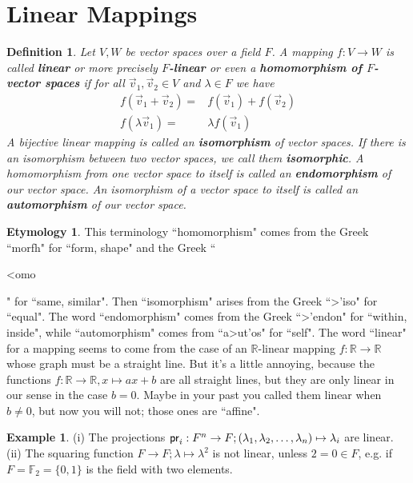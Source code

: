 \documentclass[11pt]{amsbook}
\newtheorem{definition}[theorem]{Definition}
\theoremstyle{definition}
\newtheorem{ex}[theorem]{Example}
\newtheorem*{etym}{Etymology}
\begin{document}
\section{Linear Mappings}

\begin{definition} \label{deflinmap} Let $V,W$ be vector spaces over a field $F$. A mapping $f: V\to W$ is called {\bf linear} or more precisely {\bf $F$-linear} or even a {\bf homomorphism of $F$-vector spaces} if for all $\vec{v}_1, \vec{v}_2\in V$ and $\lambda\in F$ we have
\begin{align*}
f(\vec{v}_1+\vec{v}_2) = & f(\vec{v}_1) + f(\vec{v}_2) \\
f(\lambda \vec{v}_1) = & \lambda f(\vec{v}_1)
\end{align*}
A bijective linear mapping is called an {\bf isomorphism} of vector spaces. If there is an isomorphism between two vector spaces, we call them {\bf isomorphic}. A homomorphism from one vector space to itself is called an {\bf endomorphism} of our vector space. An isomorphism of a vector space to itself is called an {\bf automorphism} of our vector space.
\end{definition}

\begin{etym} This terminology ``homomorphism" comes from the Greek ``\greektext morfh\latintext" for ``form, shape" and the Greek ``\begin{greek} <omo \end{greek}" \latintext for ``same, similar".  Then ``isomorphism" arises from the Greek ``\greektext >'iso\latintext" for ``equal". The word ``endomorphism" comes from the Greek ``\greektext >'endon\latintext" for ``within, inside", while ``automorphism" comes from ``\greektext a>ut'os\latintext" for ``self". The word ``linear" for a mapping seems to come from the case of an $\mathbb{R}$-linear mapping $f: \mathbb{R}\to \mathbb{R}$ whose graph must be a straight line. But it's a little annoying, because the functions $f: \mathbb{R}\to \mathbb{R}, x\mapsto ax+b$ are all straight lines, but they are only linear in our sense in the case $b=0$. Maybe in your past you called them linear when $b\neq 0$, but now you will not; those ones are ``affine".
\end{etym}

\begin{ex} (i) The projections  ${\sf pr}_i : F^n \to F;(\lambda_1,\lambda_2,\dots,\lambda_n) \mapsto \lambda_i$ are linear. \\
(ii) The squaring
function  $F\to F;\lambda \mapsto \lambda^2$ is not linear, unless $2=0 \in F$, e.g. if $F={\mathbb F}_2=\{0,1\}$ is the field with two elements.
\end{ex}
\end{document}
